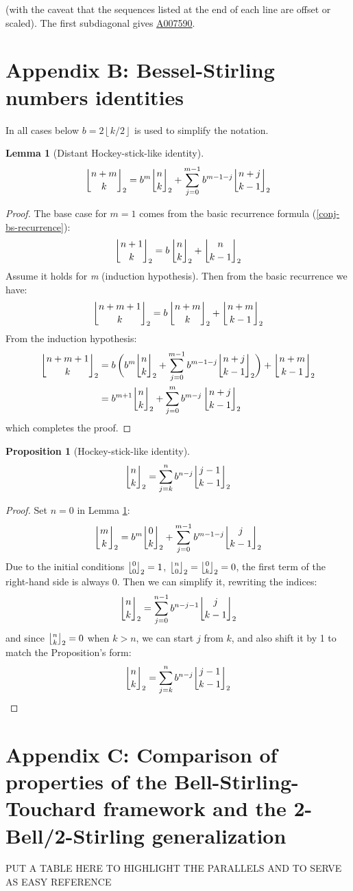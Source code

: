 \documentclass[a4paper]{amsart}
\newcommand{\mStirling}[0]{\genfrac{\lfloor}{\rfloor}{0pt}{}}
\newcommand{\floor}[1]{\left\lfloor #1 \right\rfloor}
\newtheorem{proposition}[theorem]{Proposition}
\newtheorem{lemma}[theorem]{Lemma}
\begin{document}
(with the caveat that the sequences listed at the end of each line are offset or scaled). The first subdiagonal gives \href{https://oeis.org/A007590}{A007590}.

\pagebreak
\section*{Appendix B: Bessel-Stirling numbers identities}
\noindent In all cases below $b = 2\floor{k/2}$ is used to simplify the notation.
\begin{lemma}[Distant Hockey-stick-like identity]\label{lemma-dist-hockey}
\[
    \mStirling{n+m}{k}_2 = b^m \mStirling{n}{k}_2 +\sum_{j=0}^{m-1}b^{m-1-j}\mStirling{n+j}{k-1}_2
\]
\end{lemma}
\begin{proof}
The base case for $m=1$ comes from the basic recurrence formula (\ref{conj-bs-recurrence}):
\[
    \mStirling{n+1}{k}_2 = b \,\mStirling{n}{k}_2 + \mStirling{n}{k-1}_2
\]
Assume it holds for \textit{m} (induction hypothesis). Then from the basic recurrence we have:
\[
    \mStirling{n+m+1}{k}_2 = b \, \mStirling{n+m}{k}_2 +\mStirling{n+m}{k-1}_2
\]
From the induction hypothesis:
\[
    \begin{aligned}
        \mStirling{n+m+1}{k}_2 &= b \, \bigg(b^m \mStirling{n}{k}_2 +\sum_{j=0}^{m-1}b^{m-1-j}\mStirling{n+j}{k-1}_2\bigg) +\mStirling{n+m}{k-1}_2 \\
                   &= b^{m+1}\mStirling{n}{k}_2+\sum_{j=0}^mb^{m-j}\, \mStirling{n+j}{k-1}_2
    \end{aligned}
\]
which completes the proof.
\end{proof}
\begin{proposition}[Hockey-stick-like identity]
    \[
        \mStirling{n}{k}_2 = \sum_{j=k}^{n}b^{n-j} \mStirling{j-1}{k-1}_2
    \]
\end{proposition}
\begin{proof}
Set $n=0$ in Lemma \ref{lemma-dist-hockey}:
$$
    \mStirling{m}{k}_2 = b^m \mStirling{0}{k}_2 +\sum_{j=0}^{m-1}b^{m-1-j}\mStirling{j}{k-1}_2
$$
Due to the initial conditions $\mStirling{0}{0}_2=1$, $\mStirling{n}{0}_2 = \mStirling{0}{k}_2 =0$, the first term of the right-hand side is always 0. Then we can simplify it, rewriting the indices:
$$
\mStirling{n}{k}_2 = \sum_{j=0}^{n-1}b^{n-j-1}\mStirling{j}{k-1}_2
$$
and since $\mStirling{n}{k}_2 =0$ when $k > n$, we can start $j$ from $k$, and also shift it by 1 to match the Proposition's form:
\[
        \mStirling{n}{k}_2 = \sum_{j=k}^{n}b^{n-j} \mStirling{j-1}{k-1}_2
\]
\end{proof}

\pagebreak
\section{Appendix C: Comparison of properties of the Bell-Stirling-Touchard framework and the 2-Bell/2-Stirling generalization}

PUT A TABLE HERE TO HIGHLIGHT THE PARALLELS AND TO SERVE AS EASY REFERENCE

\printbibliography
\end{document}
